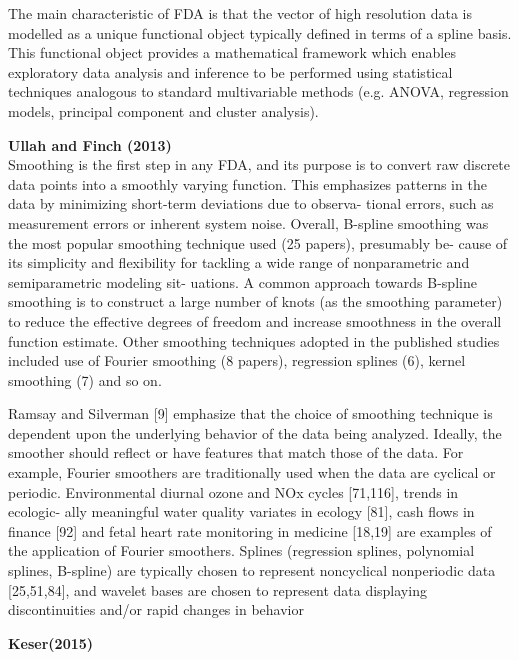 \documentclass[12pt]{article}
\begin{document}
The main characteristic of FDA is that the vector of high resolution data is modelled
as a unique functional object typically defined in terms of a spline basis. This functional
object provides a mathematical framework which enables exploratory data analysis and inference
to be performed using statistical techniques analogous to standard multivariable methods
(e.g. ANOVA, regression models, principal component and cluster analysis).

    \textbf{Ullah and Finch (2013)}\\

    Smoothing is the first step in any FDA, and its purpose is to convert raw discrete data
    points into a smoothly varying function. This emphasizes patterns in the data by minimizing
    short-term deviations due to observa- tional errors, such as measurement errors or inherent
    system noise. Overall, B-spline smoothing was the most popular smoothing technique used
    (25 papers), presumably be- cause of its simplicity and flexibility for tackling a wide
    range of nonparametric and semiparametric modeling sit- uations. A common approach
    towards B-spline smoothing is to construct a large number of knots (as the smoothing parameter)
    to reduce the effective degrees of freedom and increase smoothness in the overall function
    estimate. Other smoothing techniques adopted in the published studies included use of
    Fourier smoothing (8 papers), regression splines (6), kernel smoothing (7) and so on.

    Ramsay and Silverman [9] emphasize that the choice of smoothing technique is dependent upon
     the underlying behavior of the data being analyzed. Ideally, the smoother should reflect
     or have features that match those of the data. For example, Fourier smoothers are
     traditionally used when the data are cyclical or periodic. Environmental diurnal
     ozone and NOx cycles [71,116], trends in ecologic- ally meaningful water quality
     variates in ecology [81], cash flows in finance [92] and fetal heart rate monitoring
     in medicine [18,19] are examples of the application of Fourier smoothers.
     Splines (regression splines, polynomial splines, B-spline) are typically
     chosen to represent noncyclical nonperiodic data [25,51,84], and wavelet
     bases are chosen to represent data displaying discontinuities and/or rapid changes in behavior

    \textbf{Keser(2015)}\\
\end{document}
